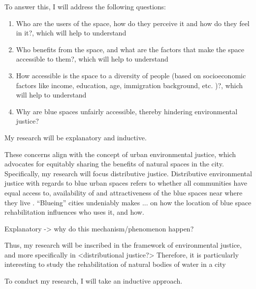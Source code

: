 \documentclass{article}
\begin{document}
To answer this, I will address the following questions:

\begin{enumerate}
	\item Who are the users of the space, how do they perceive it and how do they feel in it?, which will help to understand
	\item Who benefits from the space, and what are the factors that make the space accessible to them?, which will help to understand
	\item How accessible is the space to a diversity of people (based on socioeconomic factors like income, education, age, immigration background, etc. \parencite{baro2021school})?, which will help to understand
	\item Why are blue spaces unfairly accessible, thereby hindering environmental justice?
\end{enumerate}


My research will be explanatory and inductive. 
 
These concerns align with the concept of urban environmental justice, which advocates for equitably sharing the benefits of natural spaces  in the city. Specifically, my research will focus distributive justice. Distributive environmental justice with regards to blue urban spaces refers to whether all communities have equal access to, availability of and attractiveness of the blue spaces near where they live \parencite{kronenberg2020environmental}. 
``Blueing'' cities undeniably makes ...
 on how the location of blue space rehabilitation influences who uses it, and how.
 
 Explanatory -> why do this mechanism/phenomenon happen? 


Thus, my research will be inscribed in the framework of environmental justice, and more specifically in <distributional justice?>
Therefore, it is particularly interesting to study the rehabilitation of natural bodies of water in a city 

To conduct my research, I will take an inductive approach. 






\end{document}
